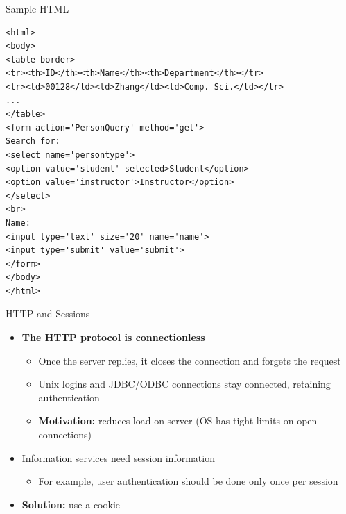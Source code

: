 \documentclass[aspectratio=169, xcolor=dvipsnames]{beamer}
\begin{document}
\begin{frame}[fragile]{Sample HTML}
    \begin{verbatim}
<html>
<body>
<table border>
<tr><th>ID</th><th>Name</th><th>Department</th></tr>
<tr><td>00128</td><td>Zhang</td><td>Comp. Sci.</td></tr>
...
</table>
<form action='PersonQuery' method='get'>
Search for:
<select name='persontype'>
<option value='student' selected>Student</option>
<option value='instructor'>Instructor</option>
</select>
<br>
Name:
<input type='text' size='20' name='name'>
<input type='submit' value='submit'>
</form>
</body>
</html>
    \end{verbatim}
\end{frame}

\begin{frame}{HTTP and Sessions}
    \begin{itemize}[<+->]
        \item \textbf{The HTTP protocol is connectionless}
        \begin{itemize}
            \item[$\triangleright$] Once the server replies, it closes the connection and forgets the request
            \item[$\triangleright$] Unix logins and JDBC/ODBC connections stay connected, retaining authentication
            \item[$\triangleright$] \textbf{Motivation:} reduces load on server (OS has tight limits on open connections)
        \end{itemize}
        \item Information services need session information
        \begin{itemize}
            \item[$\triangleright$] For example, user authentication should be done only once per session
        \end{itemize}
        \item \textbf{Solution:} use a cookie
    \end{itemize}
\end{frame}
\end{document}
